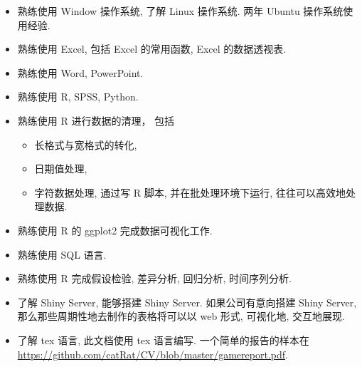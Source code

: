\begin{itemize}
\item 熟练使用 Window 操作系统, 了解 Linux 操作系统. 两年 Ubuntu 操作系统使用经验.
\item 熟练使用 Excel, 包括 Excel 的常用函数, Excel 的数据透视表.
\item 熟练使用 Word, PowerPoint.
\item 熟练使用 R, SPSS, Python.
\item 熟练使用 R 进行数据的清理， 包括
\begin{itemize}
\item 长格式与宽格式的转化,
\item 日期值处理,
\item 字符数据处理,
\newline\noindent 通过写 R 脚本, 并在批处理环境下运行, 往往可以高效地处理数据.
\end{itemize}
\item 熟练使用 R 的 ggplot2 完成数据可视化工作.
\item 熟练使用 SQL 语言.
\item 熟练使用 R 完成假设检验, 差异分析, 回归分析, 时间序列分析.
\item 了解 Shiny Server, 能够搭建 Shiny Server. 如果公司有意向搭建 Shiny Server, 那么那些周期性地去制作的表格将可以以 web 形式, 可视化地, 交互地展现.
\item 了解 tex 语言, 此文档使用 tex 语言编写. 一个简单的报告的样本在\url{https://github.com/catRat/CV/blob/master/gamereport.pdf}.
\end{itemize}
